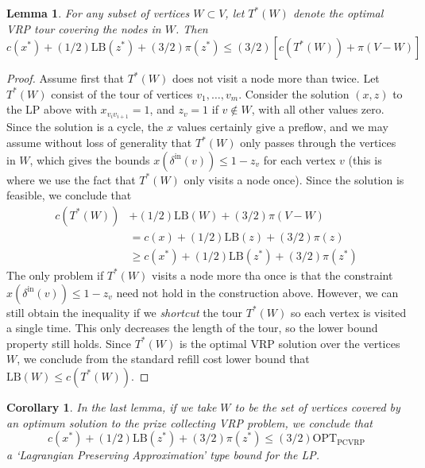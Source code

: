 \documentclass{article}
\theoremstyle{plain}
\newtheorem{lemma}{Lemma}
\newtheorem*{corollary}{Corollary}
\begin{document}
\begin{lemma}\label{thm:VRPTourBound}
    For any subset of vertices $W \subset V$, let $T^*(W)$ denote the optimal VRP tour covering the nodes in $W$. Then
    \[ c(x^*) + (1/2)\text{LB}(z^*) + (3/2) \pi(z^*) \leq (3/2)[c(T^*(W)) + \pi(V-W)] \]
\end{lemma}
\begin{proof}
    Assume first that $T^*(W)$ does not visit a node more than twice. Let $T^*(W)$ consist of the tour of vertices $v_1, \dots, v_m$. Consider the solution $(x,z)$ to the LP above with $x_{v_i v_{i+1}} = 1$, and $z_v = 1$ if $v \not \in W$, with all other values zero. Since the solution is a cycle, the $x$ values certainly give a preflow, and we may assume without loss of generality that $T^*(W)$ only passes through the vertices in $W$, which gives the bounds $x(\delta^{\text{in}}(v)) \leq 1 - z_v$ for each vertex $v$ (this is where we use the fact that $T^*(W)$ only visits a node once). Since the solution is feasible, we conclude that
    \begin{align*}
        c(T^*(W)) &+ (1/2) \text{LB}(W) + (3/2) \pi(V-W)\\
        &= c(x) + (1/2) \text{LB}(z) + (3/2) \pi(z)\\
        &\geq c(x^*) + (1/2) \text{LB}(z^*) + (3/2) \pi(z^*)
    \end{align*}
    The only problem if $T^*(W)$ visits a node more tha once is that the constraint $x(\delta^{\text{in}}(v)) \leq 1 - z_v$ need not hold in the construction above. However, we can still obtain the inequality if we {\it shortcut} the tour $T^*(W)$ so each vertex is visited a single time. This only decreases the length of the tour, so the lower bound property still holds. Since $T^*(W)$ is the optimal VRP solution over the vertices $W$, we conclude from the standard refill cost lower bound that $\text{LB}(W) \leq c(T^*(W))$.
\end{proof}

\begin{corollary}
    In the last lemma, if we take $W$ to be the set of vertices covered by an optimum solution to the prize collecting VRP problem, we conclude that
    \[ c(x^*) + (1/2) \text{LB}(z^*) + (3/2) \pi(z^*) \leq (3/2) \text{OPT}_{\text{PCVRP}} \]
    a `Lagrangian Preserving Approximation' type bound for the LP.
\end{corollary}
\end{document}

